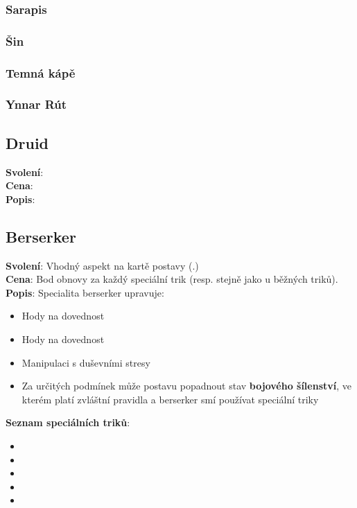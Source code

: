 \documentclass[../main.tex]{subfiles}
\begin{document}
\subsubsection{Sarapis}
\label{sec:sarapis}

\subsubsection{Šin}
\label{sec:sin}

\subsubsection{Temná kápě}
\label{sec:temna-kap}

\subsubsection{Ynnar Rút}
\label{sec:ynnar-rut}


\begin{tcolorbox}
  
\subsection{Druid}
\label{sec:pov-druid}
\textbf{Svolení}:\\
\textbf{Cena}:\\
\textbf{Popis}:\\

\end{tcolorbox}

\begin{tcolorbox}
\subsection{Berserker}
\label{sec:berserker}
\textbf{Svolení}: Vhodný aspekt na kartě postavy (.)\\
\textbf{Cena}: Bod obnovy za každý speciální trik (resp. stejně jako u běžných triků).\\
\textbf{Popis}: Specialita berserker upravuje:
\begin{itemize}
    \item Hody na dovednost 
    \item Hody na dovednost 
    \item Manipulaci s duševními stresy
    \item Za určitých podmínek může postavu popadnout stav \textbf{bojového šílenství}, ve kterém platí zvláštní pravidla a berserker smí používat speciální triky
\end{itemize}
\textbf{Seznam speciálních triků}:
\begin{itemize}
    \item {}
    \item {}
    \item {}
    \item {}
    \item {}
\end{itemize}
\end{tcolorbox}
\end{document}
